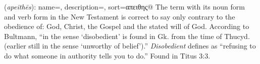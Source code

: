\item[Disobedient,]

(\textit{apeithēs}):
{
    name=,
    description={},
    sort=απειθης@
}
The term with its noun form  and verb form  in the New Testament is correct to say only contrary to the obedience of: God, Christ, the Gospel and the stated will of God. According to Bultmann, ``in the sense `disobedient' is found in Gk. from the time of Thucyd. (earlier still in the sense `unworthy of belief').''
\emph{Disobedient} defines as ``refusing to do what someone in authority tells you to do.''
Found in Titus 3:3.
